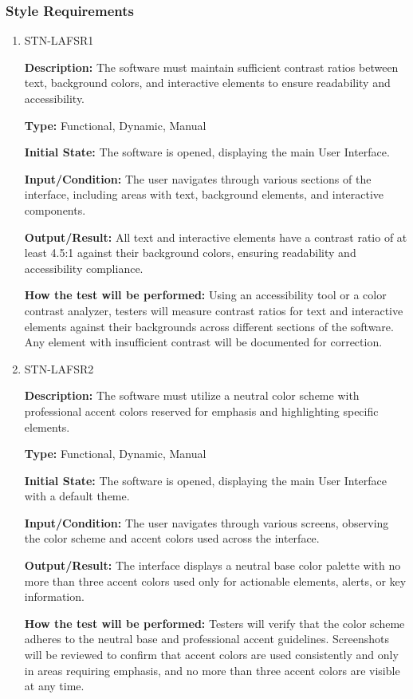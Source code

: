 \documentclass[12pt, titlepage]{article}
\begin{document}
\subsubsection{Style Requirements}
\begin{enumerate}
\item{STN-LAFSR1\\}

\textbf{Description:} The software must maintain sufficient contrast ratios between text, background colors, and interactive elements to ensure readability and accessibility.

\textbf{Type:} Functional, Dynamic, Manual

\textbf{Initial State:} The software is opened, displaying the main User Interface.

\textbf{Input/Condition:} The user navigates through various sections of the interface, including areas with text, background elements, and interactive components.

\textbf{Output/Result:} All text and interactive elements have a contrast ratio of at least 4.5:1 against their background colors, ensuring readability and accessibility compliance.

\textbf{How the test will be performed:} Using an accessibility tool or a color contrast analyzer, testers will measure contrast ratios for text and interactive elements against their backgrounds across different sections of the software. Any element with insufficient contrast will be documented for correction.

\item{STN-LAFSR2\\}

\textbf{Description:} The software must utilize a neutral color scheme with professional accent colors reserved for emphasis and highlighting specific elements.

\textbf{Type:} Functional, Dynamic, Manual

\textbf{Initial State:} The software is opened, displaying the main User Interface with a default theme.

\textbf{Input/Condition:} The user navigates through various screens, observing the color scheme and accent colors used across the interface.

\textbf{Output/Result:} The interface displays a neutral base color palette with no more than three accent colors used only for actionable elements, alerts, or key information.

\textbf{How the test will be performed:} Testers will verify that the color scheme adheres to the neutral base and professional accent guidelines. Screenshots will be reviewed to confirm that accent colors are used consistently and only in areas requiring emphasis, and no more than three accent colors are visible at any time.


\end{enumerate}
\end{document}
